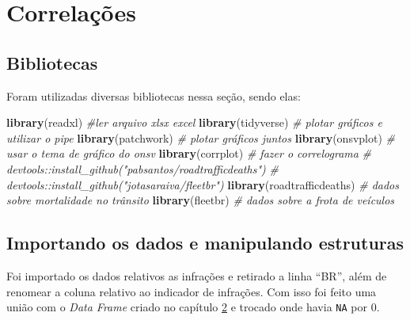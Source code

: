 \documentclass[
]{book}
\newenvironment{Shaded}{\begin{snugshade}}{\end{snugshade}}
\newcommand{\CommentTok}[1]{\textcolor[rgb]{0.56,0.35,0.01}{\textit{#1}}}
\newcommand{\FunctionTok}[1]{\textcolor[rgb]{0.13,0.29,0.53}{\textbf{#1}}}
\newcommand{\NormalTok}[1]{#1}
\newcommand{\StringTok}[1]{\textcolor[rgb]{0.31,0.60,0.02}{#1}}
\begin{document}
\chapter{Correlações}\label{correlauxe7uxf5es}

\section{Bibliotecas}\label{bibliotecas-4}

Foram utilizadas diversas bibliotecas nessa seção, sendo elas:

\begin{Shaded}
\begin{Highlighting}[]
\FunctionTok{library}\NormalTok{(}\StringTok{\textquotesingle{}readxl\textquotesingle{}}\NormalTok{) }\CommentTok{\#ler arquivo xlsx excel}
\FunctionTok{library}\NormalTok{(}\StringTok{\textquotesingle{}tidyverse\textquotesingle{}}\NormalTok{) }\CommentTok{\# plotar gráficos e utilizar o pipe}
\FunctionTok{library}\NormalTok{(}\StringTok{\textquotesingle{}patchwork\textquotesingle{}}\NormalTok{) }\CommentTok{\# plotar gráficos juntos}
\FunctionTok{library}\NormalTok{(}\StringTok{\textquotesingle{}onsvplot\textquotesingle{}}\NormalTok{) }\CommentTok{\# usar o tema de gráfico do onsv}
\FunctionTok{library}\NormalTok{(}\StringTok{\textquotesingle{}corrplot\textquotesingle{}}\NormalTok{) }\CommentTok{\# fazer o correlograma}
\CommentTok{\# devtools::install\_github("pabsantos/roadtrafficdeaths")}
\CommentTok{\# devtools::install\_github("jotasaraiva/fleetbr")}
\FunctionTok{library}\NormalTok{(}\StringTok{\textquotesingle{}roadtrafficdeaths\textquotesingle{}}\NormalTok{) }\CommentTok{\# dados sobre mortalidade no trânsito}
\FunctionTok{library}\NormalTok{(}\StringTok{\textquotesingle{}fleetbr\textquotesingle{}}\NormalTok{) }\CommentTok{\# dados sobre a frota de veículos}
\end{Highlighting}
\end{Shaded}

\section{Importando os dados e manipulando estruturas}\label{importando-os-dados-e-manipulando-estruturas}

Foi importado os dados relativos as infrações e retirado a linha ``BR'', além de renomear a coluna relativo ao indicador de infrações. Com isso foi feito uma união com o \emph{Data Frame} criado no capítulo \hyperref[radar-frota]{2} e trocado onde havia \texttt{NA} por 0.
\end{document}
